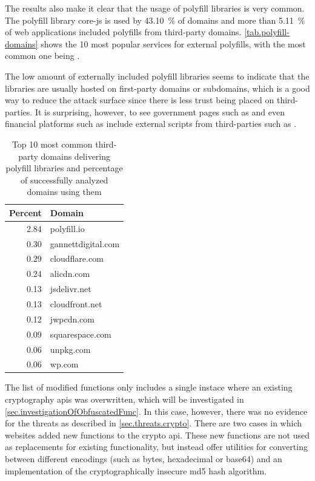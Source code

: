 \filbreak{}

The results also make it clear that the usage of polyfill libraries is very common. The polyfill library core-js is used by \SI[round-precision=0]{43.10}{\percent} of domains and more than \SI[round-precision=0]{5.11}{\percent} of web applications included polyfills from third-party domains. \autoref{tab.polyfill-domains} shows the 10 most popular services for external polyfills, with the most common one being .

The low amount of externally included polyfill libraries seems to indicate that the libraries are usually hosted on first-party domains or subdomains, which is a good way to reduce the attack surface since there is less trust being placed on third-parties. It is surprising, however, to see government pages such as  and even financial platforms such as  include external scripts from third-parties such as .

\begin{table}[h]
    \centering
    \begin{tabular}{|r|l|}
    \hline
    Percent & Domain \\
    \hline
    2.84 & polyfill.io\\
    0.30 & gannettdigital.com\\
    0.29 & cloudflare.com\\
    0.24 & alicdn.com\\
    0.13 & jsdelivr.net\\
    0.13 & cloudfront.net\\
    0.12 & jwpcdn.com\\
    0.09 & squarespace.com\\
    0.06 & unpkg.com\\
    0.06 & wp.com\\
    \hline
    \end{tabular}
    \caption{Top 10 most common third-party domains delivering polyfill libraries and percentage of successfully analyzed domains using them}
    \label{tab.polyfill-domains}
\end{table}

The list of modified functions only includes a single instace where an existing cryptography \acsp{api} was overwritten, which will be investigated in \autoref{sec.investigationOfObfuscatedFunc}. In this case, however, there was no evidence for the threats as described in \autoref{sec.threats.crypto}. There are two cases in which websites added new functions to the crypto \acs{api}. These new functions are not used as replacements for existing functionality, but instead offer utilities for converting between different encodings (such as bytes, hexadecimal or base64) and an implementation of the cryptographically insecure md5 hash algorithm.

